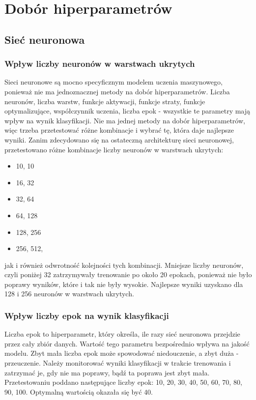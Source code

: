 \section{Dobór hiperparametrów}\label{sec:dobor_hiperparametrow}
\subsection{Sieć neuronowa}\label{subsec:dobor_hiperparametrow_siec_neuronowa}
\subsubsection{Wpływ liczby neuronów w warstwach ukrytych}\label{subsubsec:liczba_neuronow}
Sieci neuronowe są mocno specyficznym modelem uczenia maszynowego, ponieważ nie ma jednoznacznej metody na dobór hiperparametrów.
Liczba neuronów, liczba warstw, funkcje aktywacji, funkcje straty, funkcje optymalizujące, współczynnik uczenia, liczba epok - wszystkie te parametry mają wpływ na wynik klasyfikacji.
Nie ma jednej metody na dobór hiperparametrów, więc trzeba przetestować różne kombinacje i wybrać tę, która daje najlepsze wyniki.
Zanim zdecydowano się na ostateczną architekturę sieci neuronowej, przetestowano różne kombinacje liczby neuronów w warstwach ukrytych:
\begin{itemize}
    \item 10, 10
    \item 16, 32
    \item 32, 64
    \item 64, 128
    \item 128, 256
    \item 256, 512,
\end{itemize}
jak i również odwrotność kolejności tych kombinacji. Mniejsze liczby neuronów, czyli poniżej 32 zatrzymywały trenowanie po około 20 epokach, ponieważ nie było poprawy wyników, 
które i tak nie były wysokie.
Najlepsze wyniki uzyskano dla 128 i 256 neuronów w warstwach ukrytych.
\subsubsection{Wpływ liczby epok na wynik klasyfikacji}\label{subsubsec:liczba_epok}
Liczba epok to hiperparametr, który określa, ile razy sieć neuronowa przejdzie przez cały zbiór danych. Wartość tego parametru bezpośrednio wpływa na jakość modelu.
Zbyt mała liczba epok może spowodować niedouczenie, a zbyt duża - przeuczenie. Należy monitorować wyniki klasyfikacji w trakcie trenowania i zatrzymać je, gdy nie ma poprawy, bądź ta poprawa jest zbyt mała.
Przetestowaniu poddano następujące liczby epok: 10, 20, 30, 40, 50, 60, 70, 80, 90, 100.
Optymalną wartością okazała się być 40.
